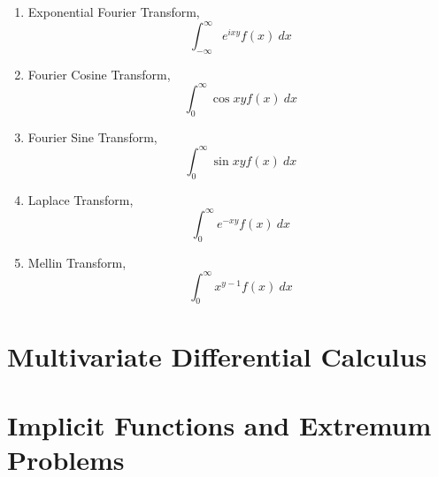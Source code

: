 \begin{enumerate}
	\item Exponential Fourier Transform,
		$$\int_{-\infty}^\infty e^{ixy}f(x)\ dx$$
	\item Fourier Cosine Transform,
		$$\int_0^\infty \cos xy f(x)\ dx$$
	\item Fourier Sine Transform,
		$$\int_0^\infty \sin xy f(x)\ dx$$
	\item Laplace Transform,
		$$\int_0^\infty e^{-xy} f(x)\ dx$$
	\item Mellin Transform,
		$$\int_0^\infty x^{y-1}f(x)\ dx$$
\end{enumerate}

\chapter{Multivariate Differential Calculus}
\chapter{Implicit Functions and Extremum Problems}


